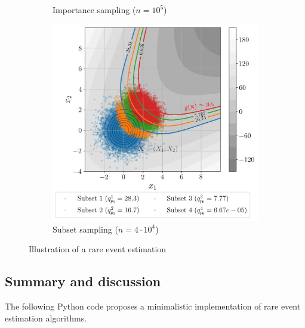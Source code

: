 \begin{figure}[ht]
\begin{subfigure}[b]{0.32\textwidth}
        \caption{Importance sampling ($n=10^5$)}
    \end{subfigure}
    \hfill
    \begin{subfigure}[b]{0.32\textwidth}
        \centering
        \includegraphics[width=\textwidth]{../numerical_experiments/chapter1/figures/reliability_SS_illustration.png}
        \caption{Subset sampling ($n=4\cdot10^4$)}
    \end{subfigure}
       \caption{Illustration of a rare event estimation}
       \label{fig:simulation_reliability}
\end{figure}



\subsection{Summary and discussion}



\begin{otexample}
    The following Python code proposes a minimalistic \ot implementation of rare event estimation algorithms. 
\end{otexample}



